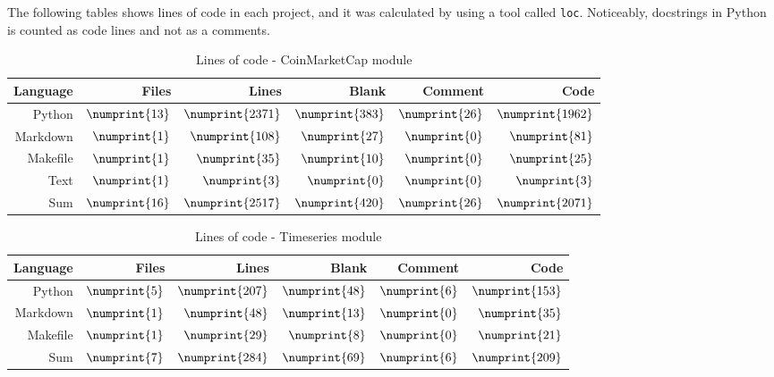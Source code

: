 The following tables shows lines of code in each project, and it was calculated by using a tool called \texttt{loc}. Noticeably, docstrings in Python is counted as code lines and not as a comments.

\begin{table}[ht]
        \centering
        \begin{tabularx}{\textwidth}{ |R|R|R|R|R|R| }\hline
        Language    & Files             & Lines             & Blank             & Comment           & Code              \\\hline
        Python      & $\numprint{13}$   & $\numprint{2371}$ & $\numprint{383}$  & $\numprint{26}$   & $\numprint{1962}$ \\
        Markdown    & $\numprint{1}$    & $\numprint{108}$  & $\numprint{27}$   & $\numprint{0}$    & $\numprint{81}$   \\
        Makefile    & $\numprint{1}$    & $\numprint{35}$   & $\numprint{10}$   & $\numprint{0}$    & $\numprint{25}$   \\
        Text        & $\numprint{1}$    & $\numprint{3}$    & $\numprint{0}$    & $\numprint{0}$    & $\numprint{3}$    \\\hline
        Sum         & $\numprint{16}$   & $\numprint{2517}$ & $\numprint{420}$  & $\numprint{26}$   & $\numprint{2071}$ \\\hline
        \end{tabularx}
        \caption{Lines of code - CoinMarketCap module}
        \label{tab:cloc_coin}
\end{table}

\begin{table}[ht]
        \centering
        \begin{tabularx}{\textwidth}{ |R|R|R|R|R|R| }\hline
        Language    & Files             & Lines             & Blank             & Comment           & Code              \\\hline
        Python      & $\numprint{5}$    & $\numprint{207}$  & $\numprint{48}$   & $\numprint{6}$    & $\numprint{153}$  \\
        Markdown    & $\numprint{1}$    & $\numprint{48}$   & $\numprint{13}$   & $\numprint{0}$    & $\numprint{35}$   \\
        Makefile    & $\numprint{1}$    & $\numprint{29}$   & $\numprint{8}$    & $\numprint{0}$    & $\numprint{21}$   \\\hline
        Sum         & $\numprint{7}$    & $\numprint{284}$  & $\numprint{69}$   & $\numprint{6}$    & $\numprint{209}$  \\\hline
        \end{tabularx}
        \caption{Lines of code - Timeseries module}
        \label{tab:cloc_timeseries}
\end{table}

